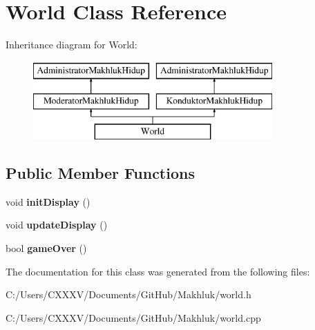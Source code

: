 \hypertarget{class_world}{}\section{World Class Reference}
\label{class_world}
Inheritance diagram for World\+:\begin{figure}[H]
\begin{center}
\leavevmode
\includegraphics[height=3.000000cm]{class_world}
\end{center}
\end{figure}
\subsection*{Public Member Functions}
\begin{DoxyCompactItemize}
\item 
void {\bfseries init\+Display} ()\hypertarget{class_world_a3ccab52e143cc85200d3d4a5384c4559}{}\label{class_world_a3ccab52e143cc85200d3d4a5384c4559}

\item 
void {\bfseries update\+Display} ()\hypertarget{class_world_a0656cc8aa64881db8880d6a1af0d5aea}{}\label{class_world_a0656cc8aa64881db8880d6a1af0d5aea}

\item 
bool {\bfseries game\+Over} ()\hypertarget{class_world_a49e876669efe76ffb57bd0bd70370151}{}\label{class_world_a49e876669efe76ffb57bd0bd70370151}

\end{DoxyCompactItemize}


The documentation for this class was generated from the following files\+:\begin{DoxyCompactItemize}
\item 
C\+:/\+Users/\+C\+X\+X\+X\+V/\+Documents/\+Git\+Hub/\+Makhluk/world.\+h\item 
C\+:/\+Users/\+C\+X\+X\+X\+V/\+Documents/\+Git\+Hub/\+Makhluk/world.\+cpp\end{DoxyCompactItemize}
